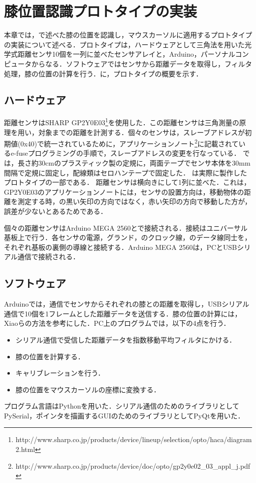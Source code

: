 \chapter{膝位置認識プロトタイプの実装}

本章では，で述べた膝の位置を認識し，マウスカーソルに適用するプロトタイプの実装について述べる．プロトタイプは，ハードウェアとして三角法を用いた光学式距離センサ10個を一列に並べたセンサアレイと，Arduino，パーソナルコンピュータからなる．ソフトウェアではセンサから距離データを取得し，フィルタ処理，膝の位置の計算を行う．に，プロトタイプの概要を示す．

\section{ハードウェア}
距離センサはSHARP GP2Y0E03\footnote{http://www.sharp.co.jp/products/device/lineup/selection/opto/haca/diagram2.html}を使用した．この距離センサは三角測量の原理を用い，対象までの距離を計測する．個々のセンサは，スレーブアドレスが初期値(0x40)で統一されているために，アプリケーションノート\footnote{http://www.sharp.co.jp/products/device/doc/opto/gp2y0e02\_03\_appl\_j.pdf}に記載されているe-fuseプログラミングの手順で，スレーブアドレスの変更を行なっている．
\SysName では，長さ約30\si{cm}のプラスティック製の定規に，両面テープでセンサ本体を30\si{mm}間隔で定規に固定し，配線類はセロハンテープで固定した．
は実際に製作したプロトタイプの一部である．
距離センサは横向きにして1列に並べた．これは，GP2Y0E03のアプリケーションノートには，センサの設置方向は，移動物体の距離を測定する時，の黒い矢印の方向ではなく，赤い矢印の方向で移動した方が，誤差が少ないとあるためである．
\par
個々の距離センサはArduino MEGA 2560と\iic で接続される．接続はユニバーサル基板上で行う．各センサの電源，グランド，\iic のクロック線，\iic のデータ線同士を，それぞれ基板の裏側の導線と接続する．Arduino MEGA 2560は，PCとUSBシリアル通信で接続される．

\section{ソフトウェア} 
Arduinoでは，\iic 通信でセンサからそれぞれの膝との距離を取得し，USBシリアル通信で10個を1フレームとした距離データを送信する．膝の位置の計算には，
Xiaoら\cite{Xiao:2018:LOP:3173574.3173669}の方法を参考にした．PC上のプログラムでは，以下の4点を行う．
\begin{itemize}
	\item シリアル通信で受信した距離データを指数移動平均フィルタにかける．
	\item 膝の位置を計算する．
	\item キャリブレーションを行う．
	\item 膝の位置をマウスカーソルの座標に変換する．
\end{itemize}
プログラム言語はPythonを用いた．シリアル通信のためのライブラリとしてPySerial，ポインタを描画するGUIのためのライブラリとしてPyQtを用いた．
